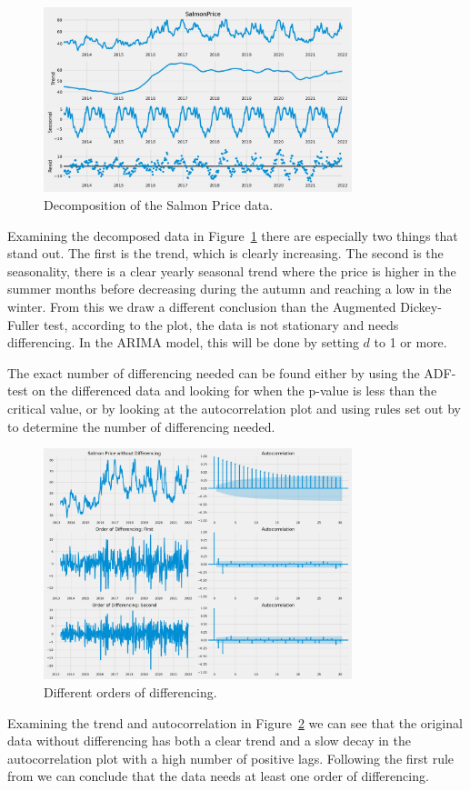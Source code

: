 \begin{figure}[H]
    \centering
    \includegraphics[width=0.8\textwidth]{data/Figures/ARIMA/Decomposition.png}
    \caption[Decomposition of the Salmon Price data]{Decomposition of the Salmon Price data.}\label{fig:Decomposition}
\end{figure}
Examining the decomposed data in Figure~\ref{fig:Decomposition} there are especially two things that stand out. The first is the trend, which is clearly increasing. The second is the seasonality, there is a clear yearly seasonal trend where the price is higher in the summer months before decreasing during the autumn and reaching a low in the winter. From this we draw a different conclusion than the Augmented Dickey-Fuller test, according to the plot, the data is not stationary and needs differencing. In the ARIMA model, this will be done by setting $d$ to 1 or more. 

The exact number of differencing needed can be found either by using the ADF-test on the differenced data and looking for when the p-value is less than the critical value, or by looking at the autocorrelation plot and using rules set out by \textcite{nau_2019} to determine the number of differencing needed. 
\begin{figure}[H]
    \centering
    \includegraphics[width=0.8\textwidth]{data/Figures/ARIMA/Diff1_ACF_30.png}
    \caption[Different orders of differencing]{Different orders of differencing.}\label{fig:ACF_Differencing}
\end{figure}
Examining the trend and autocorrelation in Figure~\ref{fig:ACF_Differencing} we can see that the original data without differencing has both a clear trend and a slow decay in the autocorrelation plot with a high number of positive lags. Following the first rule from \textcite{nau_2019} we can conclude that the data needs at least one order of differencing.

